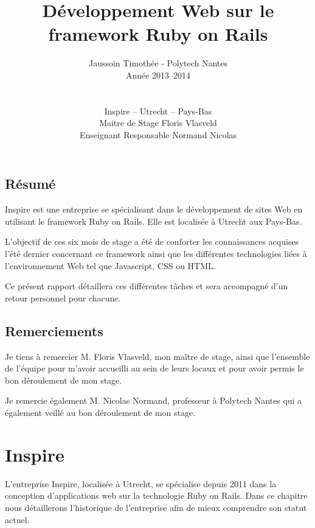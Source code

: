 \documentclass[12pt,a4paper]{book}
\author{Jaussoin Timothée - Polytech Nantes\\ Année 2013--2014 \\
\\ \\ Inspire -- Utrecht -- Pays-Bas\\  Maitre de Stage Floris Vlasveld\\ Enseignant Responsable Normand Nicolas}
\title{Développement Web sur le framework Ruby on Rails}
\begin{document}
\begin{titlepage}
	\maketitle
\end{titlepage}

\tableofcontents

\newpage
\clearpage
{}
    \section*{Résumé}
  Inspire est une entreprise se spécialisant dans le développement de sites Web en utilisant le framework Ruby on Rails. Elle est localisée à Utrecht aux Pays-Bas.
  
  L'objectif de ces six mois de stage a été de conforter les connaissances acquises l'été dernier concernant ce framework ainsi que les différentes technologies liées à l'environnement Web tel que Javascript, CSS ou HTML.

    Ce présent rapport détaillera ces différentes tâches et sera accompagné d'un retour personnel pour chacune.  

\newpage
\clearpage
{}
\section*{Remerciements}

Je tiens à remercier M. Floris Vlasveld, mon maître de stage, ainsi que l'ensemble de l'équipe pour m'avoir accueilli au sein de leurs locaux et pour avoir permis le bon déroulement de mon stage.

Je remercie également M. Nicolas Normand, professeur à Polytech Nantes qui a également veillé au bon déroulement de mon stage.


\chapter{Inspire}

L'entreprise Inspire, localisée à Utrecht, se spécialise depuis 2011 dans la conception d'applications web sur la technologie Ruby on Rails. Dans ce chapitre nous détaillerons l'historique de l'entreprise afin de mieux comprendre son statut actuel.
\end{document}
